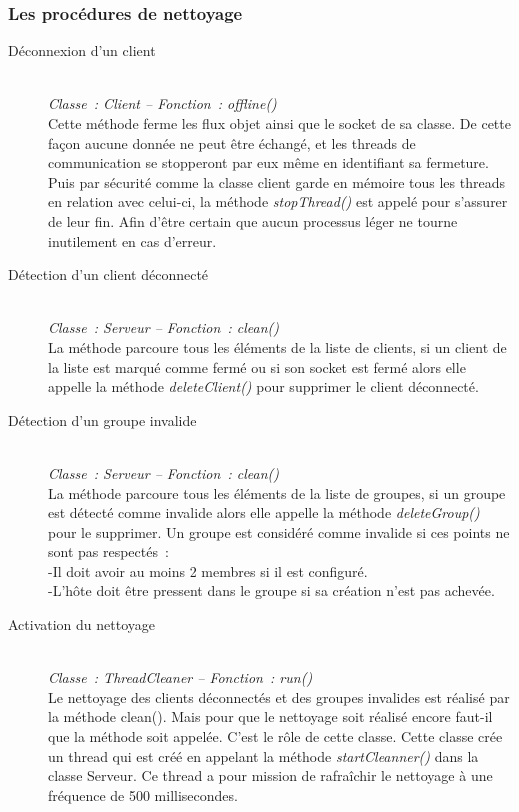 \documentclass[a4paper,11pt]{report}
\begin{document}
\subsubsection{Les procédures de nettoyage}
\begin{description}
  \item[Déconnexion d’un client]
  \textit{\\Classe : Client – Fonction : offline()\\}
Cette méthode ferme les flux objet ainsi que le socket de sa classe. De cette façon aucune donnée ne peut être échangé, et les threads de communication se stopperont par eux même en identifiant sa fermeture.
Puis par sécurité comme la classe client garde en mémoire tous les threads en relation avec celui-ci, la méthode \textit{stopThread()} est appelé pour s’assurer de leur fin. Afin d’être certain que aucun processus léger ne tourne inutilement en cas d’erreur.
  
  \item[Détection d’un client déconnecté]
  \textit{\\Classe : Serveur – Fonction : clean()\\}
  La méthode parcoure tous les éléments de la liste de clients, si un client de la liste est marqué comme fermé ou si son socket est fermé alors elle appelle la méthode \textit{deleteClient()} pour supprimer le client déconnecté.
  
  \item[Détection d’un groupe invalide]
  \textit{\\Classe : Serveur – Fonction : clean()\\}
  La méthode parcoure tous les éléments de la liste de groupes, si un groupe est détecté comme invalide alors elle appelle la méthode \textit{deleteGroup()} pour le supprimer.
Un groupe est considéré comme invalide si ces points ne sont pas respectés :\\
-Il doit avoir au moins 2 membres si il est configuré.\\
-L’hôte doit être pressent dans le groupe si sa création n’est pas achevée.

  \item[Activation du nettoyage]
  \textit{\\Classe : ThreadCleaner – Fonction : run()\\}
  Le nettoyage des clients déconnectés et des groupes invalides est réalisé par la méthode clean(). Mais pour que le nettoyage soit réalisé encore faut-il que la méthode soit appelée. C’est le rôle de cette classe. Cette classe crée un thread qui est créé en appelant la méthode \textit{startCleanner()} dans la classe Serveur. Ce thread a pour mission de rafraîchir le nettoyage à une fréquence de 500 millisecondes.
  
  \end{description}
  
\end{document}
